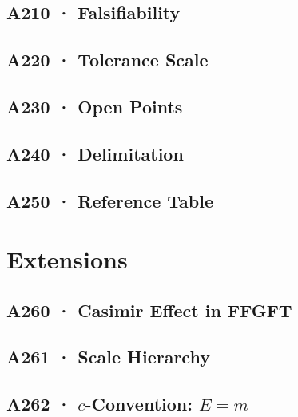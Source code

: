 \documentclass[11pt,twoside,openright]{book}
\begin{document}
\chapter[A210 · Falsifiability]{A210 · Falsifiability}


\chapter[A220 · Tolerance Scale]{A220 · Tolerance Scale}


\chapter[A230 · Open Points]{A230 · Open Points}


\chapter[A240 · Delimitation]{A240 · Delimitation}


\chapter[A250 · Reference Table]{A250 · Reference Table}


\part{Extensions}

\chapter[A260 · Casimir Effect]{A260 · Casimir Effect in FFGFT}


\chapter[A261 · Scale Hierarchy]{A261 · Scale Hierarchy}


\chapter[A262 · $c$-Convention]{A262 · $c$-Convention: $E=m$}

\end{document}
